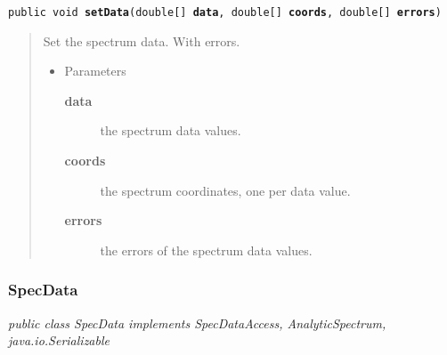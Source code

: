 \documentclass[twoside,11pt]{article}
\renewcommand{\_}{\texttt{\symbol{95}}}
\newcommand{\startsection}[4]{
   \subsubsection{\label{#3}{#2}}
   #4
}
\newcommand{\method}[1]{\texttt{#1}}
\newenvironment{desc}{\begin{quote}}{\end{quote}}
\begin{document}
\method{public void \textbf{setData}(\texttt{double[]} \textbf{data}, \texttt{double[]} \textbf{coords}, \texttt{double[]} \textbf{errors})\label{l25}\label{l26}}
\begin{desc}Set the spectrum data. With errors.
\begin{itemize}
\item{Parameters
  \begin{description}
   \item[\textbf{data}]{the spectrum data values.}
   \item[\textbf{coords}]{the spectrum coordinates, one per data value.}
   \item[\textbf{errors}]{the errors of the spectrum data values.}
  \end{description}}
\end{itemize}
\end{desc}

\startsection{Class}{SpecData}{l1}

\fbox{\parbox{\textwidth}{
\textit{public
 class SpecData implements SpecDataAccess, AnalyticSpectrum, java.io.Serializable}
}} %



\end{document}
